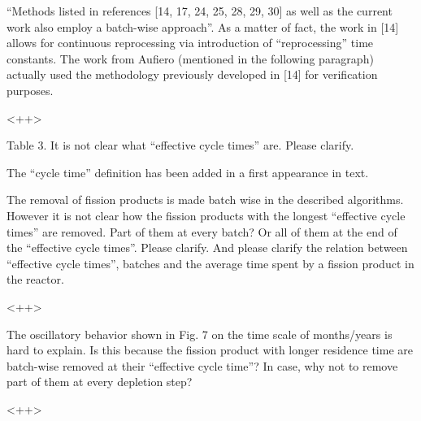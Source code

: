 \documentclass[answers,11pt]{exam}
\begin{document}
\begin{questions}
        \question ``Methods listed in references [14, 17, 24, 25, 28, 29, 30] 
        as well as the current work also employ a batch-wise approach''. As a 
        matter of fact, the work in [14]  allows for continuous reprocessing 
        via introduction of ``reprocessing'' time constants. The work from  
        Aufiero (mentioned in the following paragraph) actually used the 
        methodology previously developed in [14]  for verification purposes.
        \begin{solution}
                <++>
        \end{solution}


        \question Table 3. It is not clear what ``effective cycle times'' are. 
        Please clarify.
        \begin{solution}
                The ``cycle time'' definition has been added in a first appearance in text.
        \end{solution}


        \question The removal of fission products is made batch wise in the 
        described algorithms. However it is not clear how the fission products 
        with the longest ``effective cycle times'' are removed. Part of them at 
        every batch? Or all of them at the end of the  ``effective cycle 
        times''.  Please clarify. And please clarify the relation between 
        ``effective cycle times'', batches and the average time spent by a 
        fission product in the reactor.
        \begin{solution}
                <++>
        \end{solution}


        \question The oscillatory behavior shown in Fig. 7 on the time scale of 
        months/years is hard to explain. Is this because the fission product 
        with longer residence time are batch-wise removed at their ``effective 
        cycle time''? In case, why not to remove part of them at every depletion 
        step?  
        \begin{solution}
                <++>
        \end{solution}



\end{questions}
\end{document}
